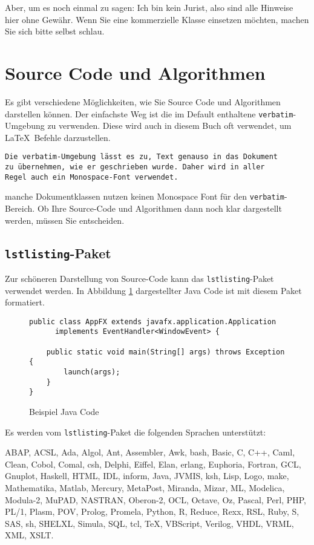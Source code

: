 Aber, um es noch einmal zu sagen: Ich bin kein Jurist, also sind alle Hinweise hier ohne Gewähr. Wenn Sie eine kommerzielle Klasse einsetzen möchten, machen Sie sich bitte selbst schlau. 


\section{Source Code und Algorithmen}

Es gibt verschiedene Möglichkeiten, wie Sie Source Code und Algorithmen darstellen können. Der einfachste Weg ist die im Default enthaltene \texttt{verbatim}-Umgebung zu verwenden. Diese wird auch in diesem Buch oft verwendet, um \LaTeX\ Befehle darzustellen.

\begin{verbatim}
Die verbatim-Umgebung lässt es zu, Text genauso in das Dokument
zu übernehmen, wie er geschrieben wurde. Daher wird in aller
Regel auch ein Monospace-Font verwendet. 
\end{verbatim}
manche Dokumentklassen nutzen keinen Monospace Font für den \texttt{verbatim}-Bereich. Ob Ihre Source-Code und Algorithmen dann noch klar dargestellt werden, müssen Sie entscheiden. 

\subsection{\texttt{lstlisting}-Paket}

Zur schöneren Darstellung von Source-Code kann das \texttt{lstlisting}-Paket verwendet werden. In Abbildung \ref{fig:java} dargestellter Java Code ist mit diesem Paket formatiert.

\begin{figure}[h]
\begin{lstlisting}
public class AppFX extends javafx.application.Application 
      implements EventHandler<WindowEvent> {

    public static void main(String[] args) throws Exception {
        launch(args);
    }
}
\end{lstlisting}
\caption{Beispiel Java Code}
\label{fig:java}
\end{figure}

Es werden vom \texttt{lstlisting}-Paket die folgenden Sprachen unterstützt:

ABAP, ACSL, Ada, Algol, Ant, Assembler, Awk, bash, Basic, C, C++, Caml, Clean, Cobol, Comal, csh, Delphi, Eiffel, Elan, erlang, Euphoria, Fortran, GCL, Gnuplot, Haskell, HTML, IDL, inform, Java, JVMIS, ksh, Lisp, Logo, make, Mathematika, Matlab, Mercury, MetaPost, Miranda, Mizar, ML, Modelica, Modula-2, MuPAD, NASTRAN, Oberon-2, OCL, Octave, Oz, Pascal, Perl, PHP, PL/1, Plasm, POV, Prolog, Promela, Python, R, Reduce, Rexx, RSL, Ruby, S, SAS, sh, SHELXL, Simula, SQL, tcl, TeX, VBScript, Verilog, VHDL, VRML, XML, XSLT.